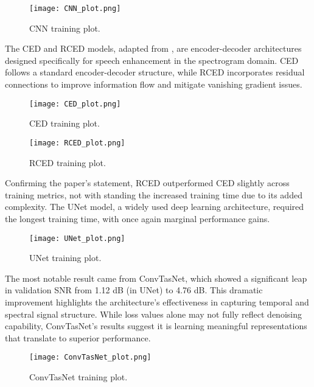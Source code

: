 \begin{figure}[H]
    \centering
    \texttt{[image: CNN\_plot.png]}
    \caption{\label{fig:cnn_training_plot} CNN training plot.}
\end{figure}

The CED and RCED models, adapted from \cite{park2017acoustic}, are encoder-decoder architectures designed specifically for speech enhancement in the spectrogram domain. CED follows a standard encoder-decoder structure, while RCED incorporates residual connections to improve information flow and mitigate vanishing gradient issues.

\begin{figure}[H]
    \centering
    \texttt{[image: CED\_plot.png]}
    \caption{\label{fig:ced_training_plot} CED training plot.}
\end{figure}

\begin{figure}[H]
    \centering
    \texttt{[image: RCED\_plot.png]}
    \caption{\label{fig:rced_training_plot} RCED training plot.}
\end{figure}

Confirming the paper’s statement, RCED outperformed CED slightly across training metrics, not with standing the increased training time due to its added complexity. The UNet model, a widely used deep learning architecture, required the longest training time, with once again marginal performance gains.

\begin{figure}[H]
    \centering
    \texttt{[image: UNet\_plot.png]}
    \caption{\label{fig:unet_training_plot} UNet training plot.}
\end{figure}

The most notable result came from ConvTasNet, which showed a significant leap in validation SNR from 1.12 dB (in UNet) to 4.76 dB. This dramatic improvement highlights the architecture’s effectiveness in capturing temporal and spectral signal structure. While loss values alone may not fully reflect denoising capability, ConvTasNet’s results suggest it is learning meaningful representations that translate to superior performance.

\begin{figure}[H]
    \centering
    \texttt{[image: ConvTasNet\_plot.png]}
    \caption{\label{fig:convtasnet_training_plot} ConvTasNet training plot.}
\end{figure}

